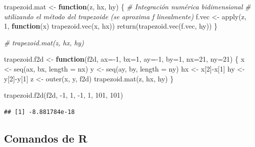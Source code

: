 \documentclass[
]{book}
\newenvironment{Shaded}{\begin{snugshade}}{\end{snugshade}}
\newcommand{\AttributeTok}[1]{\textcolor[rgb]{0.77,0.63,0.00}{#1}}
\newcommand{\CommentTok}[1]{\textcolor[rgb]{0.56,0.35,0.01}{\textit{#1}}}
\newcommand{\ControlFlowTok}[1]{\textcolor[rgb]{0.13,0.29,0.53}{\textbf{#1}}}
\newcommand{\DecValTok}[1]{\textcolor[rgb]{0.00,0.00,0.81}{#1}}
\newcommand{\FunctionTok}[1]{\textcolor[rgb]{0.00,0.00,0.00}{#1}}
\newcommand{\NormalTok}[1]{#1}
\newcommand{\OtherTok}[1]{\textcolor[rgb]{0.56,0.35,0.01}{#1}}
\newcommand{\SpecialCharTok}[1]{\textcolor[rgb]{0.00,0.00,0.00}{#1}}
\theoremstyle{break}
\theoremstyle{definition}
\theoremstyle{definition}
\theoremstyle{definition}
\theoremstyle{definition}
\theoremstyle{remark}
\begin{document}
\begin{Shaded}
\begin{Highlighting}[]
\NormalTok{trapezoid.mat }\OtherTok{\textless{}{-}} \ControlFlowTok{function}\NormalTok{(z, hx, hy) \{ }
\CommentTok{\# Integración numérica bidimensional}
\CommentTok{\# utilizando el método del trapezoide (se aproxima f linealmente)}
\NormalTok{  f.vec }\OtherTok{\textless{}{-}} \FunctionTok{apply}\NormalTok{(z, }\DecValTok{1}\NormalTok{, }\ControlFlowTok{function}\NormalTok{(x) }\FunctionTok{trapezoid.vec}\NormalTok{(x, hx))}
  \FunctionTok{return}\NormalTok{(}\FunctionTok{trapezoid.vec}\NormalTok{(f.vec, hy)) }
\NormalTok{\}}

\CommentTok{\# trapezoid.mat(z, hx, hy) }

\NormalTok{trapezoid.f2d }\OtherTok{\textless{}{-}} \ControlFlowTok{function}\NormalTok{(f2d, }\AttributeTok{ax=}\SpecialCharTok{{-}}\DecValTok{1}\NormalTok{, }\AttributeTok{bx=}\DecValTok{1}\NormalTok{, }\AttributeTok{ay=}\SpecialCharTok{{-}}\DecValTok{1}\NormalTok{, }\AttributeTok{by=}\DecValTok{1}\NormalTok{, }\AttributeTok{nx=}\DecValTok{21}\NormalTok{, }\AttributeTok{ny=}\DecValTok{21}\NormalTok{) \{ }
\NormalTok{  x }\OtherTok{\textless{}{-}} \FunctionTok{seq}\NormalTok{(ax, bx, }\AttributeTok{length =}\NormalTok{ nx)}
\NormalTok{  y }\OtherTok{\textless{}{-}} \FunctionTok{seq}\NormalTok{(ay, by, }\AttributeTok{length =}\NormalTok{ ny)}
\NormalTok{  hx }\OtherTok{\textless{}{-}}\NormalTok{ x[}\DecValTok{2}\NormalTok{]}\SpecialCharTok{{-}}\NormalTok{x[}\DecValTok{1}\NormalTok{]}
\NormalTok{  hy }\OtherTok{\textless{}{-}}\NormalTok{ y[}\DecValTok{2}\NormalTok{]}\SpecialCharTok{{-}}\NormalTok{y[}\DecValTok{1}\NormalTok{]}
\NormalTok{  z }\OtherTok{\textless{}{-}} \FunctionTok{outer}\NormalTok{(x, y, f2d)}
  \FunctionTok{trapezoid.mat}\NormalTok{(z, hx, hy)}
\NormalTok{\}}

\FunctionTok{trapezoid.f2d}\NormalTok{(f2d, }\SpecialCharTok{{-}}\DecValTok{1}\NormalTok{, }\DecValTok{1}\NormalTok{, }\SpecialCharTok{{-}}\DecValTok{1}\NormalTok{, }\DecValTok{1}\NormalTok{, }\DecValTok{101}\NormalTok{, }\DecValTok{101}\NormalTok{) }
\end{Highlighting}
\end{Shaded}

\begin{verbatim}
## [1] -8.881784e-18
\end{verbatim}

\hypertarget{comandos-de-r-1}{%
\subsection{Comandos de R}\label{comandos-de-r-1}}
\end{document}
